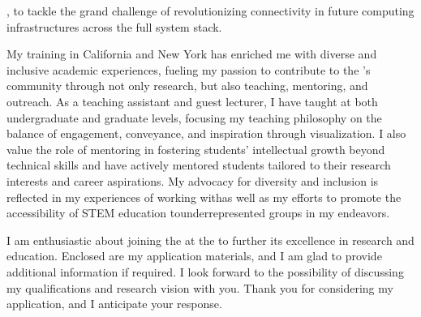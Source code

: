 , to tackle the grand challenge of revolutionizing connectivity in future computing infrastructures across the full system stack.

My training in California and New York has enriched me with diverse and inclusive academic experiences, fueling my passion to contribute to the \appSchool{}'s community through not only research, but also teaching, mentoring, and outreach. As a teaching assistant and guest lecturer, I have taught at both undergraduate and graduate levels, focusing my teaching philosophy on the balance of engagement, conveyance, and inspiration through visualization. I also value the role of mentoring in fostering students' intellectual growth beyond technical skills and have actively mentored students tailored to their research interests and career aspirations. My advocacy for diversity and inclusion is reflected in my experiences of working with\textemdash as well as my efforts to promote the accessibility of STEM education to\textemdash underrepresented groups in my endeavors.

I am enthusiastic about joining the \appDept{} at the \appSchool{} to further its excellence in research and education. Enclosed are my application materials, and I am glad to provide additional information if required. I look forward to the possibility of discussing my qualifications and research vision with you. Thank you for considering my application, and I anticipate your response.
